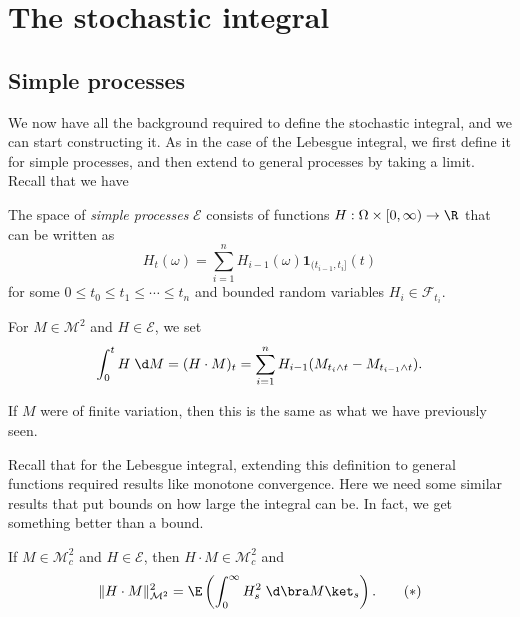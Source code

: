\documentclass[a4paper]{article}
\begin{document}
\section{The stochastic integral}
\subsection{Simple processes}
We now have all the background required to define the stochastic integral, and we can start constructing it. As in the case of the Lebesgue integral, we first define it for simple processes, and then extend to general processes by taking a limit. Recall that we have

\begin{defi}
  The space of \emph{simple processes} $\mathcal{E}$ consists of functions $H: \Omega \times [0, \infty) \to \R$ that can be written as
  \[
    H_t(\omega) = \sum_{i = 1}^n H_{i - 1}(\omega) \mathbf{1}_{(t_{i - 1}, t_i]} (t)
  \]
  for some $0 \leq t_0 \leq t_1 \leq \cdots \leq t_n$ and bounded random variables $H_i \in \mathcal{F}_{t_i}$.
\end{defi}

\begin{defi}[$H\cdot M$]
  For $M \in \mathcal{M}^2$ and $H \in \mathcal{E}$, we set
  \[
    \int_0^t H \;\d M = (H\cdot M)_t = \sum_{i = 1}^n H_{i - 1} (M_{t_i \wedge t} - M_{t_{i - 1} \wedge t}).
  \]
\end{defi}
If $M$ were of finite variation, then this is the same as what we have previously seen.

Recall that for the Lebesgue integral, extending this definition to general functions required results like monotone convergence. Here we need some similar results that put bounds on how large the integral can be. In fact, we get something better than a bound.

\begin{prop}
  If $M \in \mathcal{M}_c^2$ and $H \in \mathcal{E}$, then $H \cdot M \in \mathcal{M}_c^2$ and
  \[
    \|H \cdot M\|_{\mathcal{M}^2}^2 = \E \left(\int_0^\infty H^2_s \;\d \bra M\ket_s\right).\tag{$*$}
  \]
\end{prop}
\end{document}

